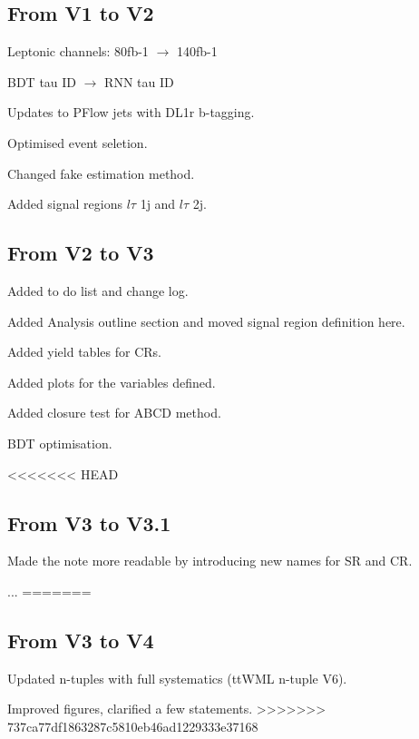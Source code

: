 \subsection{From V1 to V2}

Leptonic channels:  80fb-1 $\to$ 140fb-1

BDT tau ID $\to$ RNN tau ID

Updates to PFlow jets with DL1r b-tagging.

Optimised event seletion.

Changed fake estimation method.

Added signal regions $l\tau$ 1j and $l\tau$ 2j.

\subsection{From V2 to V3}

Added to do list and change log.

Added Analysis outline section and moved signal region definition here.

Added yield tables for CRs.

Added plots for the variables defined.

Added closure test for ABCD method.

BDT optimisation.

<<<<<<< HEAD
\subsection{From V3 to V3.1}

Made the note more readable by introducing new names for SR and CR.

...
=======
\subsection{From V3 to V4}

Updated n-tuples with full systematics (ttWML n-tuple V6).

Improved figures, clarified a few statements.
>>>>>>> 737ca77df1863287c5810eb46ad1229333e37168
